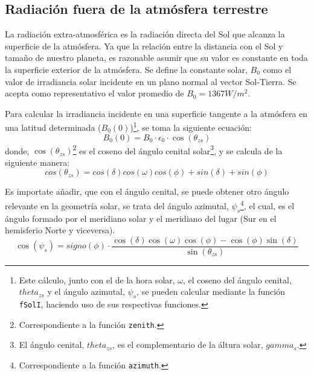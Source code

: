 \subsection{Radiación fuera de la atmósfera terrestre}
\label{sec:orgb21a990}
La radiación extra-atmosférica es la radiación directa del Sol que alcanza la superficie de la atmósfera. Ya que la relación entre la distancia con el Sol y tamaño de nuestro planeta, es razonable asumir que su valor es constante en toda la superficie exterior de la atmósfera. Se define la constante solar, \(B_0\) como el valor de irradiancia solar incidente en un plano normal al vector Sol-Tierra. Se acepta como representativo el valor promedio de \(B_0=1367W/m^2\).

Para calcular la irradiancia incidente en una superficie tangente a la atmósfera en una latitud determinada (\(B_0(0)\))\footnote{Este cálculo, junto con el de la hora solar, \(\omega\), el coseno del ángulo cenital, \(theta_{zs}\) y  el ángulo azimutal, \(\psi_s\), se pueden calcular mediante la función \texttt{fSolI}, haciendo uso de sus respectivas funciones.}, se toma la siguiente ecuación: 
\begin{equation}
B_0(0)=B_0 \cdot \epsilon_0 \cdot \cos(\theta_{zs})
\label{eq:irradianciaextra}
\end{equation}
donde, \(\cos(\theta_{zs})\)\footnote{Correspondiente a la función \texttt{zenith}.} es el coseno del ángulo cenital solar\footnote{El ángulo cenital, \(theta_{zs}\), es el complementario de la áltura solar, \(gamma_s\).}, y se calcula de la siguiente manera:
\begin{equation}
cos(\theta_{zs})=cos(\delta)cos(\omega)cos(\phi)+sin(\delta)+sin(\phi)
\end{equation}

Es importate añadir, que con el ángulo cenital, se puede obtener otro ángulo relevante en la geometría solar, se trata del ángulo azimutal, \(\psi_s\)\footnote{Correspondiente a la función \texttt{azimuth}.}, el cual, es el ángulo formado por el meridiano solar y el meridiano del lugar (Sur en el hemisferio Norte y viceversa). 
\begin{equation}
\cos(\psi_s)=signo(\phi)\cdot \frac{\cos(\delta)\cos(\omega)\cos(\phi)-\cos(\phi)\sin(\delta)}{\sin(\theta_{zs})}
\end{equation}

